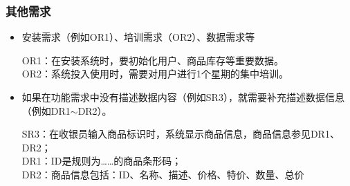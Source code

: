 \subsubsection{其他需求}
\begin{itemize}
    \item 安装需求（例如OR1）、培训需求（OR2）、数据需求等
    
    {\kaishu 
    OR1：在安装系统时，要初始化用户、商品库存等重要数据。\\
    OR2：系统投入使用时，需要对用户进行1个星期的集中培训。
    }
    \item 如果在功能需求中没有描述数据内容（例如SR3），就需要补充描述数据信息（例如DR1$\sim$DR2）。
    
    {\kaishu
    SR3：在收银员输入商品标识时，系统显示商品信息，商品信息参见DR1、DR2；\\
    DR1：ID是规则为……的商品条形码；\\
    DR2：商品信息包括：ID、名称、描述、价格、特价、数量、总价
    }
\end{itemize}

